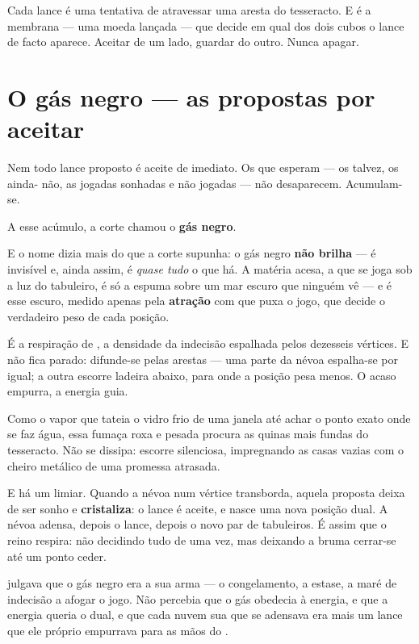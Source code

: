 \documentclass[livro.tex]{subfiles}
\begin{document}
\medskip

Cada lance é uma tentativa de atravessar uma aresta do tesseracto. E é a membrana ---
uma moeda lançada --- que decide em qual dos dois
cubos o lance de facto aparece. Aceitar de um lado, guardar do outro. Nunca apagar.

\section{O gás negro --- as propostas por aceitar}

Nem todo lance proposto é aceite de imediato. Os que esperam --- os talvez, os ainda-
não, as jogadas sonhadas e não jogadas --- não desaparecem. Acumulam-se.

A esse acúmulo, a corte chamou o \textbf{gás negro}.

\medskip

E o nome dizia mais do que a corte supunha: o gás negro \textbf{não brilha} --- é
invisível e, ainda assim, é \emph{quase tudo} o que há. A matéria acesa, a que se joga
sob a luz do tabuleiro, é só a espuma sobre um mar escuro que ninguém vê --- e é esse
escuro, medido apenas pela \textbf{atração} com que puxa o jogo, que decide o verdadeiro
peso de cada posição.

\medskip

É a respiração de \Ven , a densidade da indecisão espalhada pelos dezesseis vértices.
E não fica parado: difunde-se pelas arestas --- uma parte da névoa espalha-se por
igual; a outra escorre ladeira abaixo, para onde a posição pesa menos. O acaso
empurra, a energia guia.

\medskip

Como o vapor que tateia o vidro frio de uma janela até achar o ponto exato onde se faz
água, essa fumaça roxa e pesada procura as quinas mais fundas do tesseracto. Não se
dissipa: escorre silenciosa, impregnando as casas vazias com o cheiro metálico de uma
promessa atrasada.

\medskip

E há um limiar. Quando a névoa num vértice transborda, aquela proposta deixa de ser
sonho e \textbf{cristaliza}: o lance é aceite, e nasce uma nova posição dual. A névoa
adensa, depois o lance, depois o novo par de tabuleiros. É assim que o reino respira:
não decidindo tudo de uma vez, mas deixando a bruma cerrar-se até um ponto ceder.

\medskip

\Ven julgava que o gás negro era a sua arma --- o congelamento, a estase, a maré de
indecisão a afogar o jogo. Não percebia que o gás obedecia à energia, e que a
energia queria o dual, e que cada nuvem sua que se adensava era mais um lance que ele
próprio empurrava para as mãos do \Lck .
\end{document}
